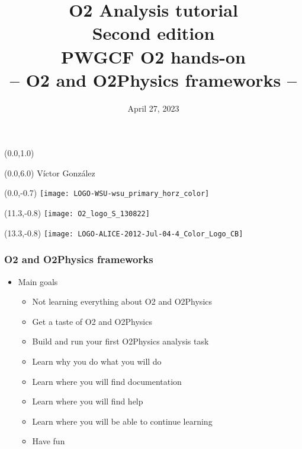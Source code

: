 \documentclass[14pt,aspectratio=169,t]{beamer}
\title{\texorpdfstring{O2 Analysis tutorial\\Second edition\\
        PWGCF O2 hands-on\\-- O2 and O2Physics frameworks --}{}}
\date{April 27, 2023}
\begin{document}

\begin{frame}
    \begin{textblock}{14}(0.0,1.0)
        \titlepage
    \end{textblock}
    
    \begin{textblock}{14}(0.0,6.0)
        \centering
        Víctor González
    \end{textblock}
    \begin{textblock}{12}(0.0,-0.7)
        \texttt{[image: LOGO-WSU-wsu\_primary\_horz\_color]}
    \end{textblock}
    \begin{textblock}{10}(11.3,-0.8)
        \texttt{[image: O2\_logo\_S\_130822]}
    \end{textblock}
    \begin{textblock}{10}(13.3,-0.8)
        \texttt{[image: LOGO-ALICE-2012-Jul-04-4\_Color\_Logo\_CB]}
    \end{textblock}
\end{frame}

\begin{frame}
  \frametitle{O2 and O2Physics frameworks}
  \begin{itemize}
    \item Main goals
    \begin{itemize}
      \item Not learning everything about O2 and O2Physics
      \item Get a taste of O2 and O2Physics
      \item Build and run your first O2Physics analysis task
      \item Learn why you do what you will do
      \item Learn where you will find documentation
      \item Learn where you will find help
      \item Learn where you will be able to continue learning
      \item Have fun
    \end{itemize}
  \end{itemize}
\end{frame}
\end{document}
